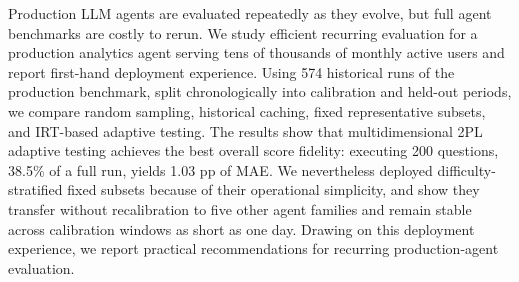 

Production LLM agents are evaluated repeatedly as they evolve, but full agent benchmarks are costly to rerun. We study efficient recurring evaluation for a production analytics agent serving
tens of thousands of monthly active users
and report first-hand deployment experience. Using 574 historical runs of the production benchmark, split chronologically into calibration and held-out periods, we compare random sampling, historical caching, fixed representative subsets, and IRT-based adaptive testing. The results show that multidimensional 2PL adaptive testing achieves the best overall score fidelity: executing 200 questions, 38.5\% of a full run, yields 1.03 pp of MAE. 
We nevertheless deployed difficulty-stratified fixed subsets because of their operational simplicity, and show they transfer without recalibration to five other agent families and remain stable across calibration windows as short as one day. 
Drawing on this deployment experience, we report practical recommendations for recurring production-agent evaluation.

